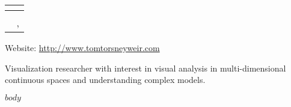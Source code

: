 \documentclass[11pt]{article}
\author{Thomas Torsney-Weir}
\makeatletter
\newcommand*{\theauthor}{}
\newcommand*{\theemail}{}
\newcommand*{\thephone}{}
\newcommand*{\theaddress}{}
\newlength{\mytitlewidth}
\renewcommand*{\maketitle}{%
  \begin{tabular*}{\mytitlewidth}{@{}l@{\extracolsep{\fill}}r@{\extracolsep{0ex}~}}
  \textbf{\large{\theauthor}} &  \\ 
    \hline
    \multicolumn{2}{r}{\theaddress} \\ 
    \multicolumn{2}{r}{\thephone, \theemail}
  \end{tabular*}
}
\makeatother
\begin{document}
%
%

\maketitle


Website: \url{http://www.tomtorsneyweir.com}

Visualization researcher with interest in visual analysis in 
multi-dimensional continuous spaces and understanding complex models.

$body$
\end{document}

